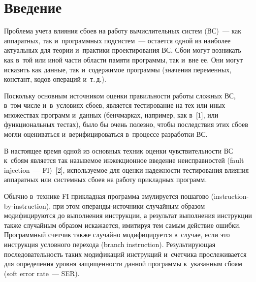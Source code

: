   



\thispagestyle{headings}


\begin{multicols}{2}

\label{st\stat}


        
       
\section{Введение}

     Проблема учета влияния сбоев на работу вычислительных систем  
(ВС)~--- как аппаратных, так и~программных подсистем~--- остается одной из 
наиболее актуальных для теории и~практики проектирования ВС.
     Сбои могут возникать как в~той или иной части области памяти 
программы, так и~вне ее. Они могут исказить как данные, так и~содержимое 
программы (значения переменных, констант, кодов операций и~т.\,д.).
     
     Поскольку основным источником оценки правильности работы сложных 
ВС, в~том числе и~в~условиях сбоев, является тестирование на тех или иных 
множествах программ и~данных (бенчмарках, например, как в~[1], или 
функциональных тестах), было бы очень полезно, чтобы последствия этих 
сбоев могли оцениваться и~верифицироваться в~процессе разработки ВС. 
     
     В настоящее время одной из основных техник оценки чувствительности 
ВС к~сбоям является так назывемое инжекционное введение неисправностей 
(fault injection~--- FI)~[2], используемое для оценки надежности тестирования 
влияния аппаратных или системных сбоев на работу прикладных программ.
     
     Обычно в~технике FI прикладная программа эмулируется пошагово 
(instruction-by-instruction), при этом опе\-ран\-ды-ис\-точ\-ни\-ки случайным 
образом модифицируются до выполнения инструкции, а результат выполнения 
инструкции также случайным образом искажается, имитируя тем самым 
действие ошибки. Программный счетчик также случайно модифицируется 
в~случае, если это инструкция условного перехода (branch instruction). 
Результирующая последовательность таких модификаций инструкций 
и~счетчика прослеживается для определения уровня защищенности данной 
программы к~указанным сбоям (soft error rate~--- SER).
     

\end{multicols}
